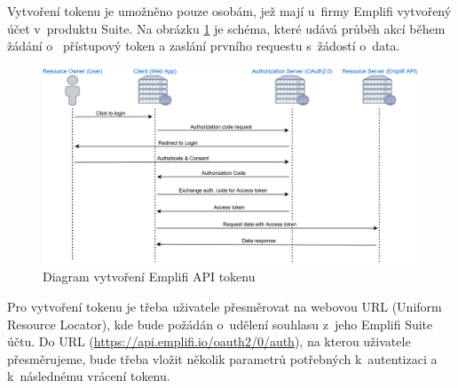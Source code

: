 \documentclass[czech, bc, kiv, he, iso690numb]{fasthesis}
\begin{document}
Vytvoření tokenu je umožněno pouze osobám, jež mají u~firmy Emplifi vytvořený účet v~produktu Suite. Na obrázku \ref{fig:emplifAPIDiagram} je schéma, které udává průběh akcí během žádání o~
přístupový token a zaslání prvního requestu s~žádostí o~data.
\begin{figure}
	\centering
	\includegraphics[width=1\textwidth]{pictures/emplifiAPI.png}
	\caption{Diagram vytvoření Emplifi API tokenu \cite{emplifiDocs}}
	\label{fig:emplifAPIDiagram}
\end{figure}

Pro vytvoření tokenu je třeba uživatele přesměrovat na webovou URL (Uniform Resource Locator), kde bude požádán o~udělení souhlasu z~jeho Emplifi Suite účtu.
Do URL (\url{https://api.emplifi.io/oauth2/0/auth}), na kterou uživatele přesměrujeme, bude třeba vložit několik parametrů potřebných k~autentizaci a k~následnému vrácení tokenu. 
\end{document}
